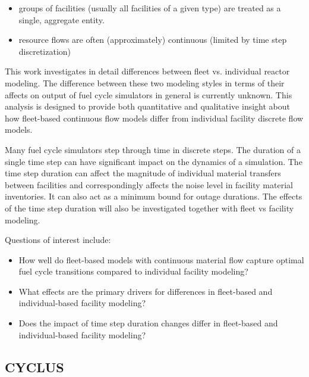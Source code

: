 \documentclass{style}
\begin{document}
\begin{itemize}

    \item groups of facilities (usually all facilities of a given type) are
    treated as a single, aggregate entity.

    \item resource flows are often (approximately) continuous (limited by time
        step discretization)

\end{itemize}

This work investigates in detail differences between fleet vs. individual
reactor modeling.  The difference between these two modeling styles in terms
of their affects on output of fuel cycle simulators in general is currently
unknown. This analysis is designed to provide both quantitative and
qualitative insight about how fleet-based continuous flow models differ from
individual facility discrete flow models.

Many fuel cycle simulators step through time in discrete steps.  The duration
of a single time step can have significant impact on the dynamics of a
simulation.  The time step duration can affect the magnitude of individual
material transfers between facilities and correspondingly affects the noise
level in facility material inventories.  It can also act as a minimum bound
for outage durations. The effects of the time step duration will also be
investigated together with fleet vs facility modeling.

Questions of interest include:

\begin{itemize}

    \item How well do fleet-based models with continuous material flow capture
    optimal fuel cycle transitions compared to individual facility modeling?

    \item What effects are the primary drivers for differences in fleet-based
    and individual-based facility modeling?

    \item Does the impact of time step duration changes differ in fleet-based
    and individual-based facility modeling?

\end{itemize}

\subsection{CYCLUS}
\end{document}

